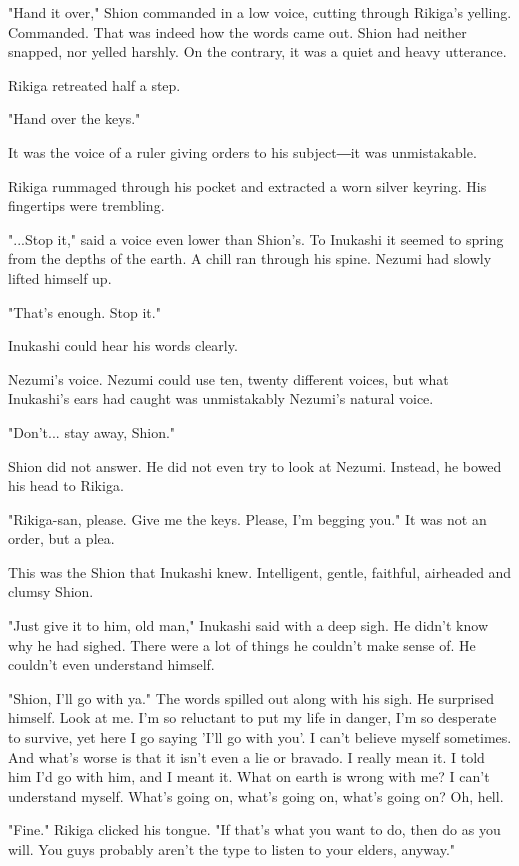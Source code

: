 "Hand it over," Shion commanded in a low voice, cutting through Rikiga's
yelling. Commanded. That was indeed how the words came out. Shion had
neither snapped, nor yelled harshly. On the contrary, it was a quiet and
heavy utterance.

Rikiga retreated half a step.

"Hand over the keys."

It was the voice of a ruler giving orders to his subject―it was
unmistakable.

Rikiga rummaged through his pocket and extracted a worn silver keyring.
His fingertips were trembling.

"...Stop it," said a voice even lower than Shion's. To Inukashi it
seemed to spring from the depths of the earth. A chill ran through his
spine. Nezumi had slowly lifted himself up.

"That's enough. Stop it."

Inukashi could hear his words clearly.

Nezumi's voice. Nezumi could use ten, twenty different voices, but what
Inukashi's ears had caught was unmistakably Nezumi's natural voice.

"Don't... stay away, Shion."

Shion did not answer. He did not even try to look at Nezumi. Instead, he
bowed his head to Rikiga.

"Rikiga-san, please. Give me the keys. Please, I'm begging you." It was
not an order, but a plea.

This was the Shion that Inukashi knew. Intelligent, gentle, faithful,
airheaded and clumsy Shion.~

"Just give it to him, old man," Inukashi said with a deep sigh. He
didn't know why he had sighed. There were a lot of things he couldn't
make sense of. He couldn't even understand himself.

"Shion, I'll go with ya." The words spilled out along with his sigh. He
surprised himself. Look at me. I'm so reluctant to put my life in
danger, I'm so desperate to survive, yet here I go saying 'I'll go with
you'. I can't believe myself sometimes. And what's worse is that it
isn't even a lie or bravado. I really mean it. I told him I'd go with
him, and I meant it. What on earth is wrong with me? I can't understand
myself. What's going on, what's going on, what's going on? Oh, hell.

"Fine." Rikiga clicked his tongue. "If that's what you want to do, then
do as you will. You guys probably aren't the type to listen to your
elders, anyway."

